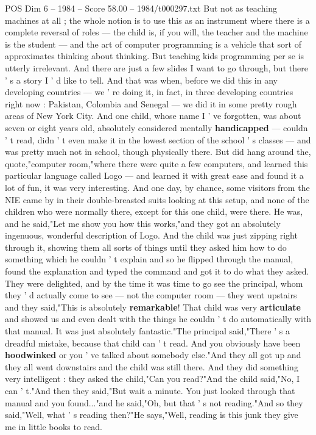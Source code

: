 \begin{textsample}{POS Dim 6 – 1984 – Score 58.00 – 1984/t000297.txt}
But not as teaching machines at all ; the whole notion is to use this as an instrument where there is a complete reversal of roles — the child is, if you will, the teacher and the machine is the student — and the art of computer programming is a vehicle that sort of approximates thinking about thinking.
But teaching kids programming per se is utterly irrelevant.
And there are just a few slides I want to go through, but there ' s a story I ' d like to tell.
And that was when, before we did this in any developing countries — we ' re doing it, in fact, in three developing countries right now : Pakistan, Colombia and Senegal — we did it in some pretty rough areas of New York City.
And one child, whose name I ' ve forgotten, was about seven or eight years old, absolutely considered mentally \textbf{handicapped} — couldn ' t read, didn ' t even make it in the lowest section of the school ' s classes — and was pretty much not in school, though physically there.
But did hang around the, quote,"computer room,"where there were quite a few computers, and learned this particular language called Logo — and learned it with great ease and found it a lot of fun, it was very interesting.
And one day, by chance, some visitors from the NIE came by in their double-breasted suits looking at this setup, and none of the children who were normally there, except for this one child, were there.
He was, and he said,"Let me show you how this works,"and they got an absolutely ingenuous, wonderful description of Logo.
And the child was just zipping right through it, showing them all sorts of things until they asked him how to do something which he couldn ' t explain and so he flipped through the manual, found the explanation and typed the command and got it to do what they asked.
They were delighted, and by the time it was time to go see the principal, whom they ' d actually come to see — not the computer room — they went upstairs and they said,"This is absolutely \textbf{remarkable}!
That child was very \textbf{articulate} and showed us and even dealt with the things he couldn ' t do automatically with that manual.
It was just absolutely fantastic."The principal said,"There ' s a dreadful mistake, because that child can ' t read.
And you obviously have been \textbf{hoodwinked} or you ' ve talked about somebody else."And they all got up and they all went downstairs and the child was still there.
And they did something very intelligent : they asked the child,"Can you read?"And the child said,"No, I can ' t."And then they said,"But wait a minute.
You just looked through that manual and you found..."and he said,"Oh, but that ' s not reading."And so they said,"Well, what ' s reading then?"He says,"Well, reading is this junk they give me in little books to read.

\end{textsample}
